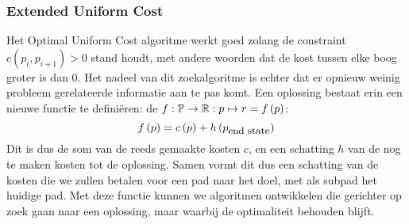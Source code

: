 \subsubsection{Extended Uniform Cost}
Het Optimal Uniform Cost algoritme werkt goed zolang de constraint $c\left(p_i,p_{i+1}\right)>0$ stand houdt, met andere woorden dat de kost tussen elke boog groter is dan 0. Het nadeel van dit zoekalgoritme is echter dat er opnieuw weinig probleem gerelateerde informatie aan te pas komt. Een oplossing bestaat erin een nieuwe functie te definiëren: de  $f:\mathbb{P}\rightarrow\mathbb{R}:p\mapsto r=f\left(p\right)$:
\begin{equation}
f\left(p\right)=c\left(p\right)+h\left(p_{\mbox{\small{end state}}}\right)
\end{equation}
Dit is dus de som van de reeds gemaakte kosten $c$, en een schatting $h$ van de nog te maken kosten tot de oplossing. Samen vormt dit dus een schatting van de kosten die we zullen betalen voor een pad naar het doel, met als subpad het huidige pad. Met deze functie kunnen we algoritmen ontwikkelen die gerichter op zoek gaan naar een oplossing, maar waarbij de optimaliteit behouden blijft.

